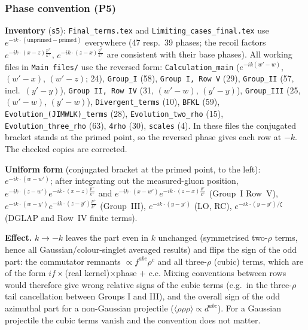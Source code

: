 \documentclass[10pt]{article}
\begin{document}
\subsubsection{Phase convention (P5)}\label{sec:pd-phase}
\noindent\textbf{Inventory} (\texttt{s5}): \texttt{Final\_terms.tex} and \texttt{Limiting\_cases\_final.tex} use $e^{-ik\cdot(\text{unprimed}-\text{primed})}$ everywhere (47 resp.\ 39 phases; the recoil factors $e^{-ik\cdot(x-z)\frac{p^{+}}{k^{+}}}$, $e^{-ik\cdot(z-x)\frac{q^{+}}{k^{+}}}$ are consistent with their base phases). All working files in \texttt{Main files/} use the reversed form: \texttt{Calculation\_main} ($e^{-ik(w'-w)}$, $(w'-x)$, $(w'-z)$; 24), \texttt{Group\_I} (58), \texttt{Group I, Row V} (29), \texttt{Group\_II} (57, incl.\ $(y'-y)$), \texttt{Group II, Row IV} (31, $(w'-w)$, $(y'-y)$), \texttt{Group\_III} (25, $(w'-w)$, $(y'-w)$), \texttt{Divergent\_terms} (10), \texttt{BFKL} (59), \texttt{Evolution\_(JIMWLK)\_terms} (28), \texttt{Evolution\_two\_rho} (15), \texttt{Evolution\_three\_rho} (63), \texttt{4rho} (30), \texttt{scales} (4). In these files the conjugated bracket stands at the primed point, so the reversed phase gives each row at $-k$. The checked copies are corrected.

\noindent\textbf{Uniform form} (conjugated bracket at the primed point, to the left): $e^{-ik\cdot(w-w')}$; after integrating out the measured-gluon position, $e^{-ik\cdot(z-w')}e^{-ik\cdot(x-z)\frac{p^{+}}{k^{+}}}$ and $e^{-ik\cdot(x-w')}e^{-ik\cdot(z-x)\frac{q^{+}}{k^{+}}}$ (Group~I Row~V), $e^{-ik\cdot(w-y')}e^{-ik\cdot(z-y')\frac{p^{+}}{k^{+}}}$ (Group~III), $e^{-ik\cdot(y-y')}$ (LO, RC), $e^{-ik\cdot(y-y')/\xi}$ (DGLAP and Row~IV finite terms).

\noindent\textbf{Effect.} $k\to-k$ leaves the part even in $k$ unchanged (symmetrised two-$\rho$ terms, hence all Gaussian/colour-singlet averaged results) and flips the sign of the odd part: the commutator remnants $\propto f^{abc}\rho^{c}$ and all three-$\rho$ (cubic) terms, which are of the form $i f\times$(real kernel)$\times$phase $+$ c.c. Mixing conventions between rows would therefore give wrong relative signs of the cubic terms (e.g.\ in the three-$\rho$ tail cancellation between Groups I and III), and the overall sign of the odd azimuthal part for a non-Gaussian projectile ($\langle\rho\rho\rho\rangle\propto d^{abc}$). For a Gaussian projectile the cubic terms vanish and the convention does not matter.
\end{document}
